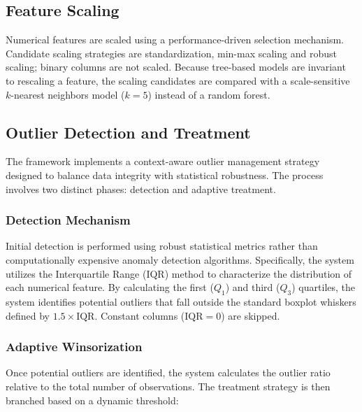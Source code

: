 \documentclass[11pt,a4paper]{article}
\begin{document}
\subsection{Feature Scaling}

Numerical features are scaled using a performance-driven selection mechanism. Candidate scaling strategies are standardization, min-max scaling and robust scaling; binary columns are not scaled. Because tree-based models are invariant to rescaling a feature, the scaling candidates are compared with a scale-sensitive $k$-nearest neighbors model ($k=5$) instead of a random forest.


\subsection{Outlier Detection and Treatment}

The framework implements a context-aware outlier management strategy designed to balance data integrity with statistical robustness. The process involves two distinct phases: detection and adaptive treatment.

\subsubsection{Detection Mechanism}
Initial detection is performed using robust statistical metrics rather than computationally expensive anomaly detection algorithms. Specifically, the system utilizes the Interquartile Range (IQR) method to characterize the distribution of each numerical feature. By calculating the first ($Q_1$) and third ($Q_3$) quartiles, the system identifies potential outliers that fall outside the standard boxplot whiskers defined by $1.5 \times \text{IQR}$. Constant columns ($\text{IQR} = 0$) are skipped.

\subsubsection{Adaptive Winsorization}
Once potential outliers are identified, the system calculates the outlier ratio relative to the total number of observations. The treatment strategy is then branched based on a dynamic threshold:
\end{document}
